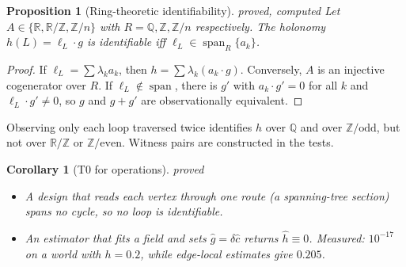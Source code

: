 \documentclass[11pt]{article}
\newtheorem{proposition}[theorem]{Proposition}
\newtheorem{corollary}[theorem]{Corollary}
\theoremstyle{definition}
\theoremstyle{remark}
\newcommand{\Z}{\mathbb{Z}}
\newcommand{\Q}{\mathbb{Q}}
\newcommand{\R}{\mathbb{R}}
\newcommand{\st}[1]{\textsf{\small\color{gray}#1}}
\begin{document}
\begin{proposition}[Ring-theoretic identifiability]\label{prop:ident}\st{proved, computed}
Let $A\in\{\R,\R/\Z,\Z/n\}$ with $R=\Q,\Z,\Z/n$ respectively. The holonomy $h(L)=\ell_L\cdot g$ is identifiable iff $\ell_L\in\operatorname{span}_R\{a_k\}$.
\end{proposition}
\begin{proof}
If $\ell_L=\sum\lambda_ka_k$, then $h=\sum\lambda_k(a_k\cdot g)$. Conversely, $A$ is an injective cogenerator over $R$. If $\ell_L\notin\operatorname{span}$, there is $g'$ with $a_k\cdot g'=0$ for all $k$ and $\ell_L\cdot g'\ne0$, so $g$ and $g+g'$ are observationally equivalent.
\end{proof}
\noindent Observing only each loop traversed twice identifies $h$ over $\Q$ and over $\Z/\text{odd}$, but not over $\R/\Z$ or $\Z/\text{even}$. Witness pairs are constructed in the tests.

\begin{corollary}[T0 for operations]\label{res:auto9}\st{proved}
\begin{itemize}
  \item A design that reads each vertex through one route (a spanning-tree section) spans no cycle, so no loop is identifiable.
  \item An estimator that fits a field and sets $\hat g=\delta\hat c$ returns $\hat h\equiv0$. Measured: $10^{-17}$ on a world with $h=0.2$, while edge-local estimates give $0.205$.
\end{itemize}
\end{corollary}
\end{document}
